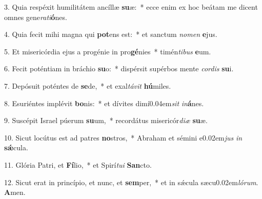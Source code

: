 \item 3. Quia respéxit humilitátem ancíllæ \textbf{su}æ:~* ecce enim ex hoc beátam me dicent omnes gene\textit{rati}\textbf{ó}nes.

\item 4. Quia fecit mihi magna qui \textbf{pot}ens est:~* et sanctum \textit{nomen} \textbf{e}jus.

\item 5. Et misericórdia ejus a progénie in pro\textbf{gé}nies~* timén\textit{tibus} \textbf{e}um.

\item 6. Fecit poténtiam in bráchio \textbf{su}o:~* dispérsit supérbos mente \textit{cordis} \textbf{su}i.

\item 7. Depósuit poténtes de \textbf{se}de,~* et exal\textit{távit} \textbf{hú}miles.

\item 8. Esuriéntes implévit \textbf{bo}nis:~* et dívites dimí\kern 0.04em\textit{sit} \textit{in}\textbf{á}nes.

\item 9. Suscépit Israel púerum \textbf{su}um,~* recordátus misericór\textit{diæ} \textbf{su}æ.

\item 10. Sicut locútus est ad patres \textbf{no}stros,~* Abraham et sémini e\kern 0.02em\textit{jus} \textit{in} \textbf{sǽ}cula.

\item 11. Glória Patri, et \textbf{Fí}lio,~* et Spirí\textit{tui} \textbf{San}cto.

\item 12. Sicut erat in princípio, et nunc, et \textbf{sem}per,~* et in sǽcula sæcu\kern 0.02em\textit{lórum}. \textbf{A}men.